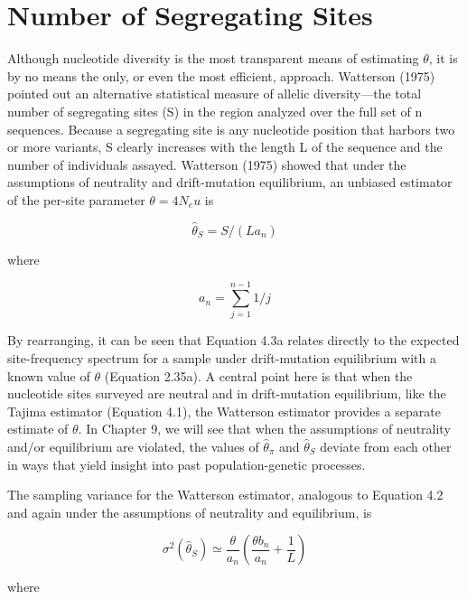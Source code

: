 \documentclass{article}
\begin{document}
\section{Number of Segregating Sites}
Although nucleotide diversity is the most transparent means of estimating  $ \theta $, it is by no means the only, or even the most efficient, approach. Watterson (1975) pointed out an alternative statistical measure of allelic diversity—the total number of segregating sites (S) in the region analyzed over the full set of n sequences. Because a segregating site is any nucleotide position that harbors two or more variants, S clearly increases with the length L of the sequence and the number of individuals assayed. Watterson (1975) showed that under the assumptions of neutrality and drift-mutation equilibrium, an unbiased estimator of the per-site parameter  $ \theta = 4N_{e}u $ is

\begin{equation}
\widehat{\theta}_{S}=S/(L a_{n})
\tag{4.3a}
\label{eq:4_3a}
\end{equation}

where

\begin{equation}
a_{n}=\sum_{j=1}^{n-1}1/j
\tag{4.3b}
\label{eq:4_3b}
\end{equation}

By rearranging, it can be seen that Equation 4.3a relates directly to the expected site-frequency spectrum for a sample under drift-mutation equilibrium with a known value of  $ \theta $ (Equation 2.35a). A central point here is that when the nucleotide sites surveyed are neutral and in drift-mutation equilibrium, like the Tajima estimator (Equation 4.1), the Watterson estimator provides a separate estimate of  $ \theta $. In Chapter 9, we will see that when the assumptions of neutrality and/or equilibrium are violated, the values of  $ \widehat{\theta}_{\pi} $ and  $ \widehat{\theta}_{S} $ deviate from each other in ways that yield insight into past population-genetic processes.

The sampling variance for the Watterson estimator, analogous to Equation 4.2 and again under the assumptions of neutrality and equilibrium, is

\begin{equation}
\sigma^{2}(\widehat{\theta}_{S})\simeq\frac{\theta}{a_{n}}\left(\frac{\theta b_{n}}{a_{n}}+\frac{1}{L}\right)
\tag{4.4a}
\label{eq:4_4a}
\end{equation}

where
\end{document}
